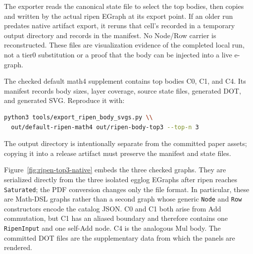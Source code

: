 \documentclass[11pt,a4paper]{article}
\newcommand{\code}[1]{\texttt{#1}}
\begin{document}
The exporter reads the canonical state file
 to select the top bodies, then copies
 and  written by the actual
ripen EGraph at its export point. If an older run predates native artifact
export, it reruns that cell's recorded  in a temporary output
directory and records  in the manifest. No
Node/Row carrier is reconstructed. These files are visualization evidence of
the completed local run, not a tier0 substitution or a proof that the body can
be injected into a live e-graph.

The checked default math4 supplement contains top bodies C0, C1, and C4. Its
manifest records body sizes, layer coverage, source state files, generated DOT,
and generated SVG. Reproduce it with:
\begin{lstlisting}[language=bash]
python3 tools/export_ripen_body_svgs.py \\
  out/default-ripen-math4 out/ripen-body-top3 --top-n 3
\end{lstlisting}
The output directory is intentionally separate from the committed paper assets;
copying it into a release artifact must preserve the manifest and state files.

Figure~\ref{fig:ripen-top3-native} embeds the three checked graphs. They are
serialized directly from the three isolated egglog EGraphs after ripen reaches
\code{Saturated}; the PDF conversion changes only the file format. In
particular, these are Math-DSL graphs rather than a second graph whose generic
\code{Node} and \code{Row} constructors encode the catalog JSON. C0 and C1
both arise from Add commutation, but C1 has an aliased boundary and therefore
contains one \code{RipenInput} and one self-Add node. C4 is the analogous Mul
body. The committed DOT files are the supplementary data from which the panels
are rendered.
\end{document}
